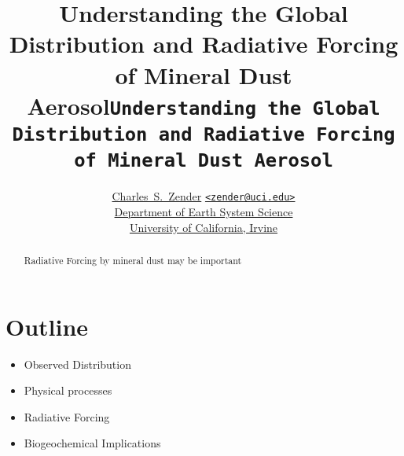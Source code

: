 \documentclass[12pt]{article}
\begin{document}

\begin{screen}
\title{\color{section0}\Huge Understanding the Global Distribution and
Radiative Forcing of Mineral Dust Aerosol}
\end{screen}

\begin{print}
\title{\Huge\texttt{Understanding the Global Distribution and
Radiative Forcing of Mineral Dust Aerosol}}
\end{print}

\author{
\color{section1}\Large
\href{http://www.ess.uci.edu/~zender}{Charles~S.~Zender}
{\small\href{mailto:zender@uci.edu}{\color{section1}\texttt{<zender@uci.edu>}}}\\
\href{http://www.ess.uci.edu}{Department of Earth System Science}\\
\href{http://www.uci.edu}{University of California, Irvine}\\
} %


\date{} %
\maketitle
\begin{screen}
\vfill
\end{screen}

\begin{abstract}
\noindent Radiative Forcing by mineral dust may be important
\end{abstract}

\begin{print}
\tableofcontents
\end{print}
\begin{screen}
\vfill
\end{screen}

\section[Outline]{Outline}
\begin{itemize}
\item Observed Distribution
\item Physical processes
\item Radiative Forcing
\item Biogeochemical Implications
\end{itemize}
\vfill
\end{document}
